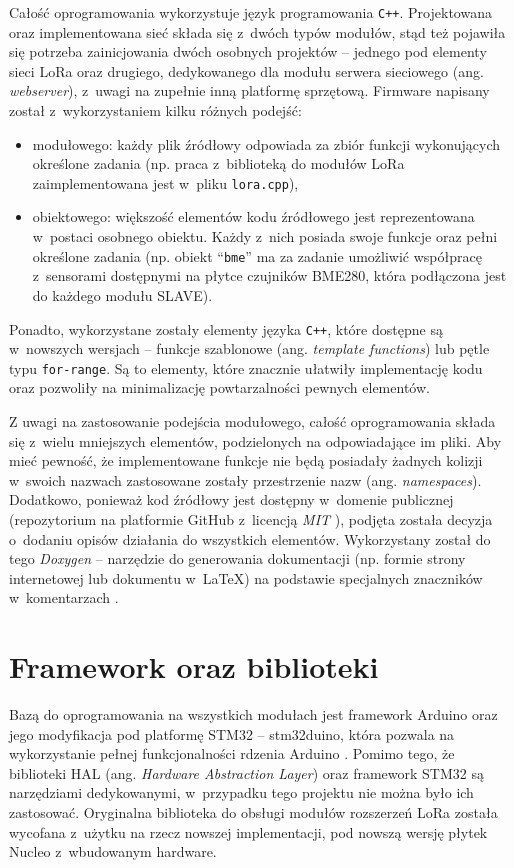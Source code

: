 Całość oprogramowania wykorzystuje język programowania \texttt{C++}. Projektowana oraz implementowana sieć składa się
z~dwóch typów modułów, stąd też pojawiła się potrzeba zainicjowania dwóch osobnych projektów -- jednego pod elementy
sieci LoRa oraz drugiego, dedykowanego dla modułu serwera sieciowego (ang. \textsl{webserver}), z~uwagi na zupełnie inną
platformę sprzętową. Firmware napisany został z~wykorzystaniem kilku różnych podejść:
\begin{itemize}[label=--]
    \item modułowego: każdy plik źródłowy odpowiada za zbiór funkcji wykonujących określone zadania (np. praca
          z~biblioteką do modułów LoRa zaimplementowana jest w~pliku \texttt{lora.cpp}),
    \item obiektowego: większość elementów kodu źródłowego jest reprezentowana w~postaci osobnego obiektu. Każdy
          z~nich posiada swoje funkcje oraz pełni określone zadania (np. obiekt \enquote{\texttt{bme}} ma za zadanie
          umożliwić współpracę z~sensorami dostępnymi na płytce czujników BME280, która podłączona jest do każdego
          modułu SLAVE).
\end{itemize}
Ponadto, wykorzystane zostały elementy języka \texttt{C++}, które dostępne są w~nowszych wersjach -- funkcje szablonowe
(ang. \textsl{template functions}) lub pętle typu \texttt{for-range}. Są to elementy, które znacznie ułatwiły
implementację kodu oraz pozwoliły na minimalizację powtarzalności pewnych elementów.

Z uwagi na zastosowanie podejścia modułowego, całość oprogramowania składa się z~wielu mniejszych elementów,
podzielonych na odpowiadające im pliki. Aby mieć pewność, że implementowane funkcje nie będą posiadały żadnych kolizji
w~swoich nazwach zastosowane zostały przestrzenie nazw (ang. \textsl{namespaces}). Dodatkowo, ponieważ kod źródłowy
jest dostępny w~domenie publicznej (repozytorium na platformie GitHub z~licencją \textsl{MIT} \cite{snyk-sw-license}),
podjęta została decyzja o~dodaniu opisów działania do wszystkich elementów. Wykorzystany został do tego \textsl{Doxygen}
-- narzędzie do generowania dokumentacji (np. formie strony internetowej lub dokumentu w~\LaTeX) na podstawie
specjalnych znaczników w~komentarzach \cite{doxygen}.

\section{Framework oraz biblioteki\label{sect:framework-libraries}} Bazą do oprogramowania na wszystkich modułach jest
framework Arduino oraz jego modyfikacja pod platformę STM32 -- stm32duino, która pozwala na wykorzystanie pełnej
funkcjonalności rdzenia Arduino \cite{stm32duino-docs}. Pomimo tego, że biblioteki HAL (ang. \textsl{Hardware
    Abstraction Layer}) oraz framework STM32 są narzędziami dedykowanymi, w~przypadku tego projektu nie można było ich
zastosować. Oryginalna biblioteka do obsługi modułów rozszerzeń LoRa została wycofana z~użytku na rzecz nowszej
implementacji, pod nowszą wersję płytek Nucleo z~wbudowanym hardware.


